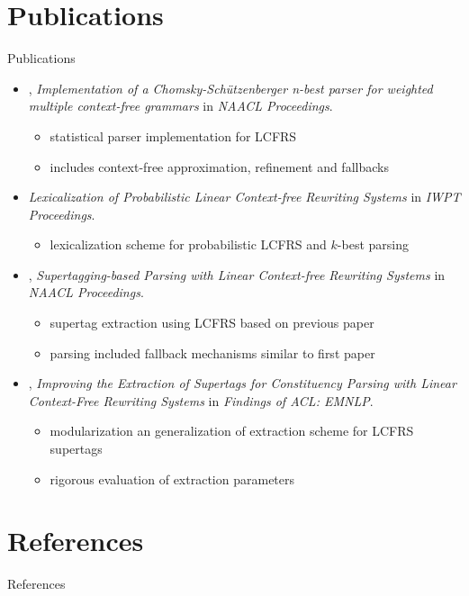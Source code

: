 \documentclass[aspectratio=169, 10pt]{beamer}
\begin{document}
    \section{Publications}
    \begin{frame}{Publications}
        \begin{itemize}
            \item \citealp*{RupDen19}, \emph{Implementation of a {C}homsky-Sch{\"u}tzenberger n-best parser for weighted multiple context-free grammars} in \emph{NAACL Proceedings}.
                \begin{itemize}
                    \item statistical parser implementation for LCFRS
                    \item includes context-free approximation, refinement and fallbacks
                \end{itemize}
            \item \citealp{MoeRup20}\emph{Lexicalization of Probabilistic Linear Context-free Rewriting Systems} in \emph{IWPT Proceedings}.
                \begin{itemize}
                    \item lexicalization scheme for probabilistic LCFRS and $k$-best parsing
                \end{itemize}
            \item \citealp{RupMoe21}, \emph{Supertagging-based Parsing with Linear Context-free Rewriting Systems} in \emph{NAACL Proceedings}.
                \begin{itemize}
                    \item supertag extraction using LCFRS based on previous paper
                    \item parsing included fallback mechanisms similar to first paper
                \end{itemize}
            \item \citealp{Rup22}, \emph{Improving the Extraction of Supertags for Constituency Parsing with Linear Context-Free Rewriting Systems} in \emph{Findings of ACL: EMNLP}.
                \begin{itemize}
                    \item modularization an generalization of extraction scheme for LCFRS supertags
                    \item rigorous evaluation of extraction parameters
                \end{itemize}
        \end{itemize}
    \end{frame}


    \section*{References}
    \begin{frame}{References}
        \footnotesize
        
        
    \end{frame}
\end{document}
